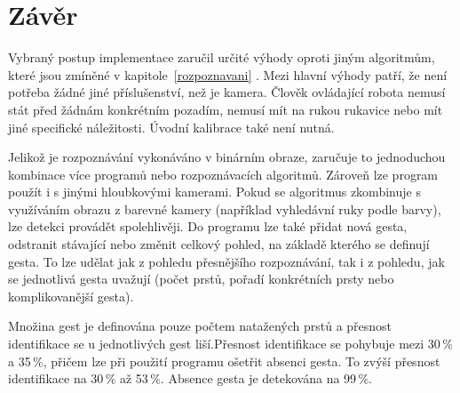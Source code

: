 \chapter{Závěr}
Vybraný postup implementace zaručil určité výhody oproti jiným algoritmům, které jsou zmíněné v kapitole~\ref{rozpoznavani} . Mezi hlavní výhody patří, že není potřeba žádné jiné příslušenství, než je kamera. Člověk ovládající robota nemusí stát před žádnám konkrétním pozadím, nemusí mít na rukou rukavice nebo mít jiné specifické náležitosti. Úvodní kalibrace také není nutná. 

Jelikož je rozpoznávání vykonáváno v binárním obraze, zaručuje to jednoduchou kombinace více programů nebo rozpoznávacích algoritmů. Zároveň lze program použít i s jinými hloubkovými kamerami. Pokud se algoritmus zkombinuje s využíváním obrazu z barevné kamery (například vyhledávní ruky podle barvy), lze detekci provádět spolehlivěji.
Do programu lze také přidat nová gesta, odstranit stávající nebo změnit celkový pohled, na základě kterého se definují gesta. To lze udělat jak z pohledu přesnějšího rozpoznávání, tak i z pohledu, jak se jednotlivá gesta uvažují (počet prstů, pořadí konkrétních prsty nebo komplikovanější gesta). 

Množina gest je definována pouze počtem natažených prstů a přesnost identifikace se u jednotlivých gest liší.Přesnost identifikace se pohybuje mezi 30\,\% a 35\,\%, přičem lze při použití programu ošetřit absenci gesta. To zvýší přesnost identifikace na 30\,\% až 53\,\%. Absence gesta je detekována na 99\,\%.


\endinput
